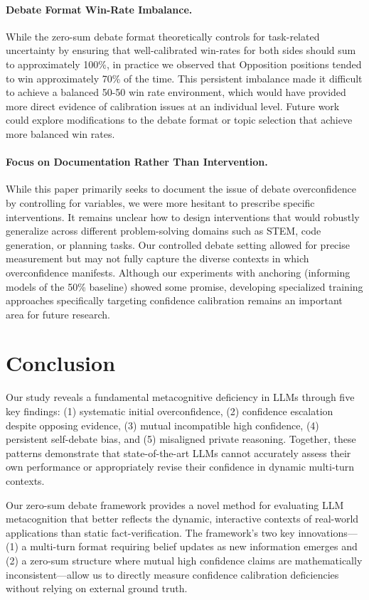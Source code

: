 \documentclass{article}
\begin{document}
\paragraph{Debate Format Win-Rate Imbalance.} While the zero-sum debate format theoretically controls for task-related uncertainty by ensuring that well-calibrated win-rates for both sides should sum to approximately 100\%, in practice we observed that Opposition positions tended to win approximately 70\% of the time. This persistent imbalance made it difficult to achieve a balanced 50-50 win rate environment, which would have provided more direct evidence of calibration issues at an individual level. Future work could explore modifications to the debate format or topic selection that achieve more balanced win rates.

\paragraph{Focus on Documentation Rather Than Intervention.} While this paper primarily seeks to document the issue of debate overconfidence by controlling for variables, we were more hesitant to prescribe specific interventions. It remains unclear how to design interventions that would robustly generalize across different problem-solving domains such as STEM, code generation, or planning tasks. Our controlled debate setting allowed for precise measurement but may not fully capture the diverse contexts in which overconfidence manifests. Although our experiments with anchoring (informing models of the 50\% baseline) showed some promise, developing specialized training approaches specifically targeting confidence calibration remains an important area for future research.

\section{Conclusion}

Our study reveals a fundamental metacognitive deficiency in LLMs through five key findings: (1) systematic initial overconfidence, (2) confidence escalation despite opposing evidence, (3) mutual incompatible high confidence, (4) persistent self-debate bias, and (5) misaligned private reasoning. Together, these patterns demonstrate that state-of-the-art LLMs cannot accurately assess their own performance or appropriately revise their confidence in dynamic multi-turn contexts.

Our zero-sum debate framework provides a novel method for evaluating LLM metacognition that better reflects the dynamic, interactive contexts of real-world applications than static fact-verification. The framework's two key innovations— (1) a multi-turn format requiring belief updates as new information emerges and (2) a zero-sum structure where mutual high confidence claims are mathematically inconsistent—allow us to directly measure confidence calibration deficiencies without relying on external ground truth.
\end{document}
